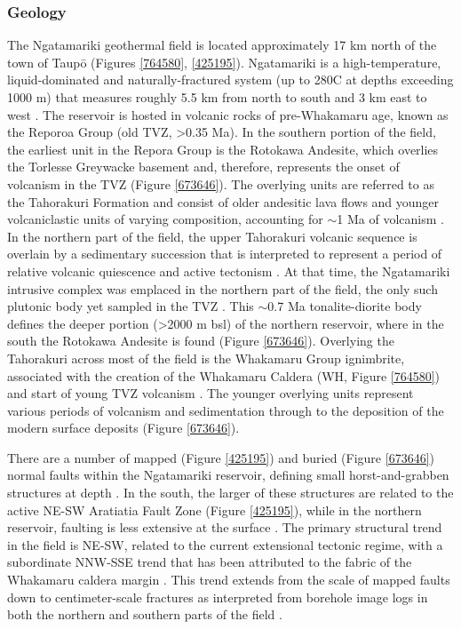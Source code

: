 \subsubsection{Geology}
The Ngatamariki geothermal field is located approximately 17 km north of the town of Taup\={o} (Figures  \ref{764580}, \ref{425195}). Ngatamariki is a high-temperature, liquid-dominated and naturally-fractured system (up to 280\textdegree{}C at depths exceeding 1000 m) that measures roughly 5.5 km from north to south and 3 km east to west \citep{Bignall_2009, Chambefort_2014}. The reservoir is hosted in volcanic rocks of pre-Whakamaru age, known as the Reporoa Group (old \acrshort{TVZ}, \textgreater0.35 Ma)\citep{Chambefort_2014}. In the southern portion of the field, the earliest unit in the Repora Group is the Rotokawa Andesite, which overlies the Torlesse Greywacke basement and, therefore, represents the onset of volcanism in the \acrshort{TVZ} \citep{Chambefort_2014,Wilson_2016} (Figure \ref{673646}). The overlying units are referred to as the Tahorakuri Formation and consist of older andesitic lava flows and younger volcaniclastic units of varying composition, accounting for $\sim$1 Ma of volcanism \citep{Chambefort_2014}. In the northern part of the field, the upper Tahorakuri volcanic sequence is overlain by a sedimentary succession that is interpreted to represent a period of relative volcanic quiescence and active tectonism \citep{Chambefort_2014}. At that time, the Ngatamariki intrusive complex was emplaced in the northern part of the field, the only such plutonic body yet sampled in the \acrshort{TVZ} \citep{Chambefort_2014}. This $\sim$0.7 Ma tonalite-diorite body defines the deeper portion (\textgreater2000 m bsl) of the northern reservoir, where in the south the Rotokawa Andesite is found \citep{Chambefort_2014} (Figure \ref{673646}). Overlying the Tahorakuri across most of the field is the Whakamaru Group ignimbrite, associated with the creation of the Whakamaru Caldera (WH, Figure \ref{764580}) and start of young \acrshort{TVZ} volcanism \citep{Chambefort_2014,Wilson_1995}. The younger overlying units represent various periods of volcanism and sedimentation through to the deposition of the modern surface deposits \citep{Chambefort_2014} (Figure \ref{673646}).

There are a number of mapped (Figure \ref{425195}) and buried (Figure \ref{673646}) normal faults within the Ngatamariki reservoir, defining small horst-and-grabben structures at depth \citep{Bignall_2009}. In the south, the larger of these structures are related to the active NE-SW Aratiatia Fault Zone (Figure \ref{425195}), while in the northern reservoir, faulting is less extensive at the surface \citep{AFDB}. The primary structural trend in the field is NE-SW, related to the current extensional tectonic regime, with a subordinate NNW-SSE trend that has been attributed to the fabric of the Whakamaru caldera margin \citep{Bignall_2009}. This trend extends from the scale of mapped faults down to centimeter-scale fractures as interpreted from borehole image logs in both the northern and southern parts of the field \citep{nm09_report,nm10_report,massiot_2012}.

